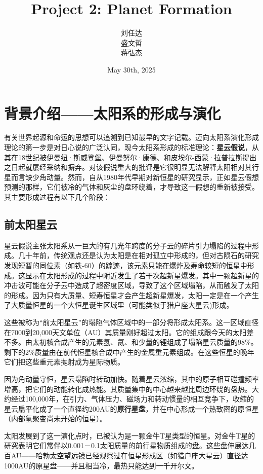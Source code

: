 \documentclass[hidelinks]{article}
\title{\textbf{Project 2: Planet Formation}}
\author{刘任达\\盛文哲\\蒋弘杰}
\date{May 30th, 2025}
\begin{document}
\hypersetup{bookmarksnumbered=true,}
\maketitle
\setcounter{tocdepth}{2}
\begin{Large}
\tableofcontents
\end{Large}%
\pagebreak

\section{背景介绍——太阳系的形成与演化}
有关世界起源和命运的思想可以追溯到已知最早的文字记载。迈向太阳系演化形成理论的第一步是对日心说的广泛认同，现今太阳系形成的标准理论：\textbf{星云假说}，从其在18世纪被伊曼纽·斯威登堡、伊曼努尔·康德、和皮埃尔-西蒙·拉普拉斯提出之日起就屡经采纳和摒弃。对该假说重大的批评是它很明显无法解释太阳相对其行星而言缺少角动量。然而，自从1980年代早期对新恒星的研究显示，正如星云假想预测的那样，它们被冷的气体和灰尘的盘环绕着，才导致这一假想的重新被接受。其主要形成过程有以下几个阶段：
\subsection{前太阳星云}
星云假说主张太阳系从一巨大的有几光年跨度的分子云的碎片引力塌陷的过程中形成。几十年前，传统观点还是认为太阳是在相对孤立中形成的，但对古陨石的研究发现短暂的同位素（如铁-60）的踪迹，该元素只能在爆炸及寿命较短的恒星中形成。这显示在太阳形成的过程中附近发生了若干次超新星爆发。其中一颗超新星的冲击波可能在分子云中造成了超密度区域，导致了这个区域塌陷，从而触发了太阳的形成。因为只有大质量、短寿恒星才会产生超新星爆发，太阳一定是在一个产生了大质量恒星的一个大恒星诞生区域里（可能类似于猎户座大星云)形成。

这些被称为“前太阳星云”的塌陷气体区域中的一部分将形成太阳系。这一区域直径在7000到20,000天文单位（AU）其质量刚好超过太阳。它的组成跟今天的太阳差不多。由太初核合成产生的元素氢、氦、和少量的锂组成了塌陷星云质量的98\%。剩下的2\%质量由在前代恒星核合成中产生的金属重元素组成。在这些恒星的晚年它们把这些重元素抛射成为星际物质。

因为角动量守恒，星云塌陷时转动加快。随着星云浓缩，其中的原子相互碰撞频率增高，把它们的动能转化成热能。其质量集中的中心越来越比周边环绕的盘热。大约经过100,000年，在引力、气体压力、磁场力和转动惯量的相互竞争下，收缩的星云扁平化成了一个直径约200AU的\textbf{原行星盘}，并在中心形成一个热致密的原恒星（内部氢聚变尚未开始的恒星）。

太阳发展到了这一演化点时，已被认为是一颗金牛T星类型的恒星。对金牛T星的研究表明它们常伴以0.001－0.1太阳质量的前行星物质组成的盘。这些盘伸展达几百AU——哈勃太空望远镜已经观察过在恒星形成区（如猎户座大星云）直径达1000AU的原星盘——并且相当冷，最热只能达到一千开尔文。
\end{document}
